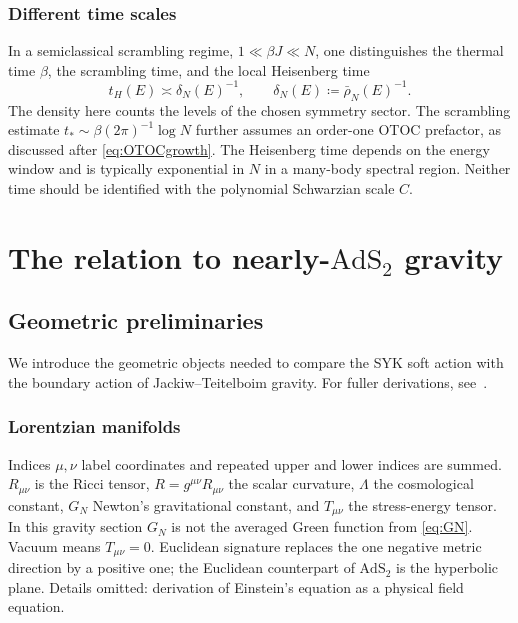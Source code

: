 \documentclass[11pt]{article}
\numberwithin{equation}{section}
\theoremstyle{exposition}
\theoremstyle{result}
\newcommand{\AdS}{\mathrm{AdS}}
\begin{document}
\subsubsection{Different time scales}

In a semiclassical scrambling regime, $1\ll\beta J\ll N$, one distinguishes the thermal time $\beta$, the scrambling time, and the local Heisenberg time
\begin{equation*}
t_H(E)\asymp\delta_N(E)^{-1},
\qquad \delta_N(E)\coloneqq \bar\rho_N(E)^{-1}.
\end{equation*}
The density here counts the levels of the chosen symmetry sector. The scrambling estimate $t_*\sim\beta(2\pi)^{-1}\log N$ further assumes an order-one OTOC prefactor, as discussed after \eqref{eq:OTOCgrowth}. The Heisenberg time depends on the energy window and is typically exponential in $N$ in a many-body spectral region. Neither time should be identified with the polynomial Schwarzian scale $C$.

\section[Nearly-AdS2 gravity]{The relation to nearly-$\AdS_2$ gravity}\label{sec:gravity}

\subsection{Geometric preliminaries}

We introduce the geometric objects needed to compare the SYK soft action with the boundary action of Jackiw--Teitelboim gravity. For fuller derivations, see~\cite{MSY,Trunin}.

\subsubsection{Lorentzian manifolds}


Indices $\mu,\nu$ label coordinates and repeated upper and lower indices are summed. $R_{\mu\nu}$ is the Ricci tensor, $R=g^{\mu\nu}R_{\mu\nu}$ the scalar curvature, $\Lambda$ the cosmological constant, $G_N$ Newton's gravitational constant, and $T_{\mu\nu}$ the stress-energy tensor. In this gravity section $G_N$ is not the averaged Green function from \eqref{eq:GN}. Vacuum means $T_{\mu\nu}=0$. Euclidean signature replaces the one negative metric direction by a positive one; the Euclidean counterpart of $\AdS_2$ is the hyperbolic plane. Details omitted: derivation of Einstein's equation as a physical field equation.
\end{document}
